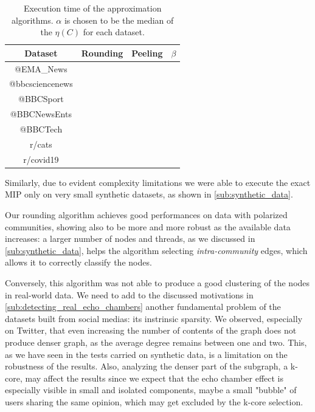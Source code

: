 \begin{table}
	\centering
	\caption[Execution time of the approximation algorithms]{Execution time of
		the approximation algorithms. $\alpha$ is chosen to be the median of the
		$\eta(C)$ for each dataset.}
	\label{tab:times-approximation}
	\begin{tabular}{c|c|c|c}
		Dataset         & Rounding & Peeling & $\beta$ \\
		\hline
		@EMA\_News      &          &         &         \\
		@bbcsciencenews &          &         &         \\
		@BBCSport       &          &         &         \\
		@BBCNewsEnts    &          &         &         \\
		@BBCTech        &          &         &         \\
		r/cats          &          &         &         \\
		r/covid19       &          &         &         \\
	\end{tabular}
\end{table}

Similarly, due to evident complexity limitations we were able to execute the exact
\acrshort{MIP} only on very small synthetic datasets, as shown in
\autoref{sub:synthetic_data}.

\bigskip

Our rounding algorithm achieves good performances on data with
polarized communities, showing also to be more and more robust as the
available data increases: a larger number of nodes and threads, as we discussed
in \autoref{sub:synthetic_data}, helps the algorithm selecting
\emph{intra-community} edges, which allows it to correctly classify the nodes.

Conversely, this algorithm was not able to produce a good clustering of the
nodes in real-world data. We need to add to the discussed motivations in
\autoref{sub:detecting_real_echo_chambers} another fundamental problem of the
datasets built from social medias: its instrinsic sparsity. We observed,
especially on Twitter, that even increasing the number of contents of the graph
does not produce denser graph, as the average degree remains between one and
two. This, as we have seen in the tests carried on synthetic data, is a limitation
on the robustness of the results. Also, analyzing the denser part of the
subgraph, a k-core, may affect the results since we expect that the echo chamber
effect is especially visible in small and isolated components, maybe a small
"bubble" of users sharing the same opinion, which may get excluded by
the k-core selection.
